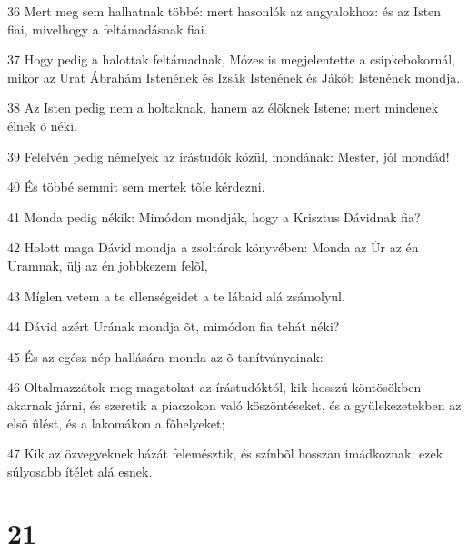 \par 36 Mert meg sem halhatnak többé: mert hasonlók az angyalokhoz: és az Isten fiai, mivelhogy a feltámadásnak fiai.
\par 37 Hogy pedig a halottak feltámadnak, Mózes is megjelentette a csipkebokornál, mikor az Urat Ábrahám Istenének és Izsák Istenének és Jákób Istenének mondja.
\par 38 Az Isten pedig nem a holtaknak, hanem az élõknek Istene: mert mindenek élnek õ néki.
\par 39 Felelvén pedig némelyek az írástudók közül, mondának: Mester, jól mondád!
\par 40 És többé semmit sem mertek tõle kérdezni.
\par 41 Monda pedig nékik: Mimódon mondják, hogy a Krisztus Dávidnak fia?
\par 42 Holott maga Dávid mondja a zsoltárok könyvében: Monda az Úr az én Uramnak, ülj az én jobbkezem felõl,
\par 43 Míglen vetem a te ellenségeidet a te lábaid alá zsámolyul.
\par 44 Dávid azért Urának mondja õt, mimódon fia tehát néki?
\par 45 És az egész nép hallására monda az õ tanítványainak:
\par 46 Oltalmazzátok meg magatokat az írástudóktól, kik hosszú köntösökben akarnak járni, és szeretik a piaczokon való köszöntéseket, és a gyülekezetekben az elsõ ûlést, és a lakomákon a fõhelyeket;
\par 47 Kik az özvegyeknek házát felemésztik, és színbõl hosszan imádkoznak; ezek súlyosabb ítélet alá esnek.

\chapter{21}

